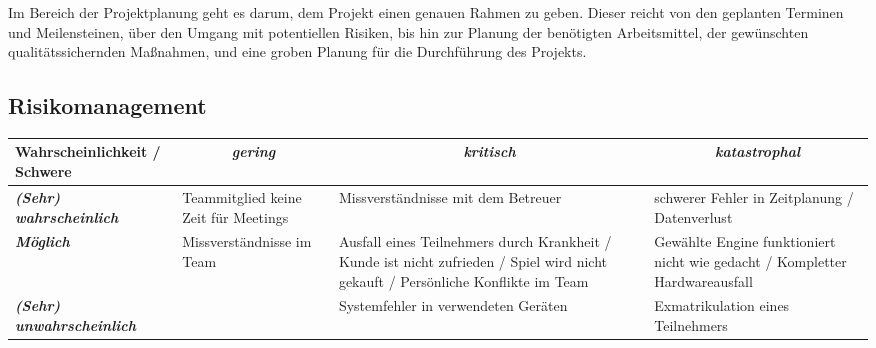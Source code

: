 Im Bereich der Projektplanung geht es darum, dem Projekt einen genauen Rahmen zu geben. Dieser reicht von den geplanten Terminen und Meilensteinen, über den Umgang mit potentiellen Risiken, bis hin zur Planung der benötigten Arbeitsmittel, der gewünschten qualitätssichernden Maßnahmen, und eine groben Planung für die Durchführung des Projekts.

\subsection{Risikomanagement}
\begin{tabular}{|p{4cm}|p{3cm}|p{3.5cm}|p{3.5cm}|}
\hline
{\textbf{Wahrscheinlichkeit / Schwere}} & \multicolumn{1}{c|}{\textit{\textbf{gering}}}  & \multicolumn{1}{c|}{\textit{\textbf{kritisch}}}  	& \multicolumn{1}{c|}{\textit{\textbf{katastrophal}}} \\ \hline
\textit{\textbf{(Sehr) wahrscheinlich}} &
\cellcolor[HTML]{FCFF2F}Teammitglied keine Zeit für Meetings 	& \cellcolor[HTML]{FE0000}Missverständnisse mit dem Betreuer & \cellcolor[HTML]{FE0000}schwerer Fehler in Zeitplanung / Datenverlust     \\ \hline
\textit{\textbf{Möglich}}               &
\cellcolor[HTML]{34FF34}Missverständnisse im Team            	& \cellcolor[HTML]{F8FF00}Ausfall eines Teilnehmers durch Krankheit / Kunde ist nicht zufrieden / Spiel wird nicht gekauft / Persönliche Konflikte im Team & \cellcolor[HTML]{F8FF00}Gewählte Engine funktioniert nicht wie gedacht / Kompletter Hardwareausfall 				  \\ \hline
\textit{\textbf{(Sehr) unwahrscheinlich}}&
\cellcolor[HTML]{34FF34} & \cellcolor[HTML]{34FF34}Systemfehler in verwendeten Geräten & \cellcolor[HTML]{F8FF00}Exmatrikulation eines Teilnehmers                                               \\ \hline
\end{tabular}

